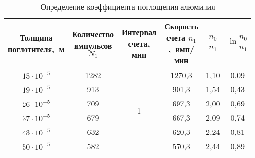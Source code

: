 \documentclass[10pt, pscyr, nonums]{hedlabwork}
\begin{document}
  \pagebreak
  
  \begin{table}[h!]
    \center
    \caption{Определение коэффициента поглощения алюминия}
    \begin{tabular}{|*{6}{C{.13}|}} \hline
      Толщина поглотителя,~м &
        Количество импульсов \( N_1 \) &
        Интервал счета, мин &
        Скорость счета \( n_1 \),~имп/мин &
        \( \dfrac{n_0}{n_1} \) &
        \( \ln\dfrac{n_0}{n_1} \) \\ \hline
      \( 15 \cdot 10^{-5} \) & 1282 &  &
        1270,3 & 1,10 & 0,09 \\ 
      \( 19 \cdot 10^{-5} \) & 913 &&
        901,3  & 1,54 & 0,43 \\ 
      \( 26 \cdot 10^{-5} \) & 709 &&
        697,3  & 2,00 & 0,69 \\ 
      \( 37 \cdot 10^{-5} \) & 679 &&
        667,3  & 2,09 & 0,74 \\ 
      \( 43 \cdot 10^{-5} \) & 632 &&
        620,3  & 2,24 & 0,81 \\ 
      \( 50 \cdot 10^{-5} \) & 582 &&
        570,3  & 2,44 & 0,89 \\ \hline
    \end{tabular}
  \end{table}
\end{document}
